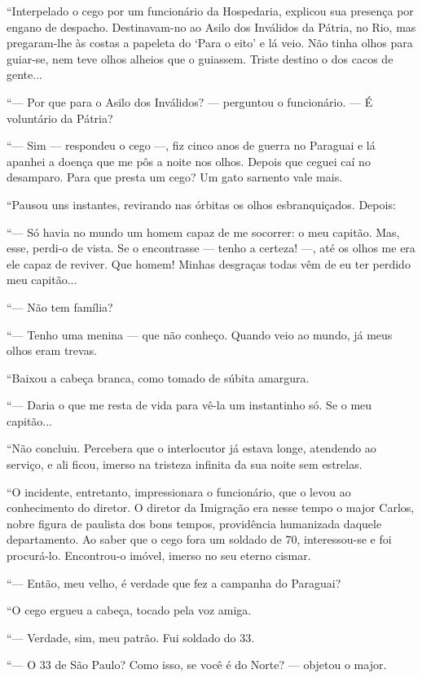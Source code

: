 ``Interpelado o cego por um funcionário da Hospedaria, explicou sua
presença por engano de despacho. Destinavam-no ao Asilo dos Inválidos da
Pátria, no Rio, mas pregaram-lhe às costas a papeleta do `Para o eito' e
lá veio. Não tinha olhos para guiar-se, nem teve olhos alheios que o
guiassem. Triste destino o dos cacos de gente...

``--- Por que para o Asilo dos Inválidos? --- perguntou o funcionário.
--- É voluntário da Pátria?

``--- Sim --- respondeu o cego ---, fiz cinco anos de guerra no Paraguai
e lá apanhei a doença que me pôs a noite nos olhos. Depois que ceguei
caí no desamparo. Para que presta um cego? Um gato sarnento vale mais.

``Pausou uns instantes, revirando nas órbitas os olhos esbranquiçados.
Depois:

``--- Só havia no mundo um homem capaz de me socorrer: o meu capitão.
Mas, esse, perdi-o de vista. Se o encontrasse --- tenho a certeza! ---,
até os olhos me era ele capaz de reviver. Que homem! Minhas desgraças
todas vêm de eu ter perdido meu capitão...

``--- Não tem família?

``--- Tenho uma menina --- que não conheço. Quando veio ao mundo, já
meus olhos eram trevas.

``Baixou a cabeça branca, como tomado de súbita amargura.

``--- Daria o que me resta de vida para vê-la um instantinho só. Se o
meu capitão...

``Não concluiu. Percebera que o interlocutor já estava longe, atendendo
ao serviço, e ali ficou, imerso na tristeza infinita da sua noite sem
estrelas.

``O incidente, entretanto, impressionara o funcionário, que o levou ao
conhecimento do diretor. O diretor da Imigração era nesse tempo o major
Carlos, nobre figura de paulista dos bons tempos, providência humanizada
daquele departamento. Ao saber que o cego fora um soldado de 70,
interessou-se e foi procurá-lo. Encontrou-o imóvel, imerso no seu eterno
cismar.

``--- Então, meu velho, é verdade que fez a campanha do Paraguai?

``O cego ergueu a cabeça, tocado pela voz amiga.

``--- Verdade, sim, meu patrão. Fui soldado do 33.

``--- O 33 de São Paulo? Como isso, se você é do Norte? --- objetou o
major.

